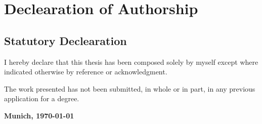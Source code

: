 \chapter*{Declearation of Authorship}

\section*{Statutory Declearation}

I hereby declare that this thesis has been composed solely by myself except
where indicated otherwise by reference or acknowledgment.

The work presented has not been submitted, in whole or in part, in any
previous application for a degree.

\vspace{1em}
\textbf{Munich, \today}
